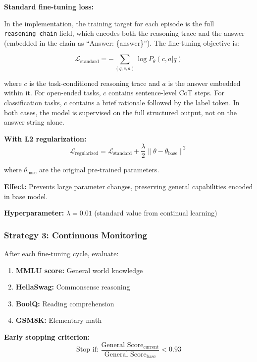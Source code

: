 \documentclass[12pt,a4paper]{article}
\theoremstyle{definition}
\begin{document}
\textbf{Standard fine-tuning loss:}

\noindent In the implementation, the training target for each episode is the full \texttt{reasoning\_chain} field, which encodes both the reasoning trace and the answer (embedded in the chain as ``Answer: \{answer\}''). The fine-tuning objective is:

\begin{equation}
\mathcal{L}_{\text{standard}} = -\sum_{(q,c,a)} \log P_\theta(c, a | q)
\end{equation}

\noindent where $c$ is the task-conditioned reasoning trace and $a$ is the answer embedded within it. For open-ended tasks, $c$ contains sentence-level CoT steps. For classification tasks, $c$ contains a brief rationale followed by the label token. In both cases, the model is supervised on the full structured output, not on the answer string alone.

\textbf{With L2 regularization:}
\begin{equation}
\mathcal{L}_{\text{regularized}} = \mathcal{L}_{\text{standard}} + \frac{\lambda}{2} \|\theta - \theta_{\text{base}}\|^2
\end{equation}

where $\theta_{\text{base}}$ are the original pre-trained parameters.

\textbf{Effect:} Prevents large parameter changes, preserving general capabilities encoded in base model.

\textbf{Hyperparameter:} $\lambda = 0.01$ (standard value from continual learning)

\subsubsection{Strategy 3: Continuous Monitoring}

After each fine-tuning cycle, evaluate:

\begin{enumerate}
    \item \textbf{MMLU score:} General world knowledge
    \item \textbf{HellaSwag:} Commonsense reasoning
    \item \textbf{BoolQ:} Reading comprehension
    \item \textbf{GSM8K:} Elementary math
\end{enumerate}

\textbf{Early stopping criterion:}
\begin{equation}
\text{Stop if: } \frac{\text{General Score}_{\text{current}}}{\text{General Score}_{\text{base}}} < 0.93
\end{equation}
\end{document}
